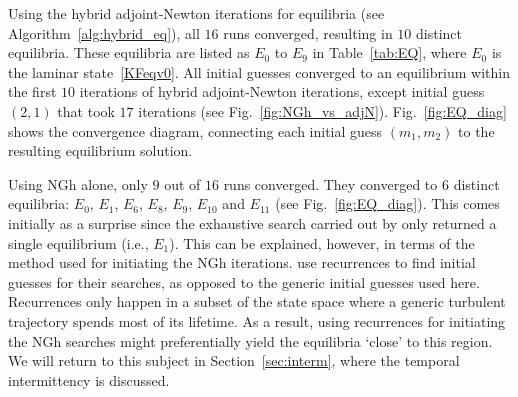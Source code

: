 \documentclass{jfm}
\begin{document}
Using the hybrid adjoint-Newton iterations for equilibria (see Algorithm~\ref{alg:hybrid_eq}), all
$16$ runs converged, resulting in $10$ distinct equilibria. These equilibria are listed as $E_0$
to $E_9$ in Table~\ref{tab:EQ}, where $E_0$ is the laminar state~\eqref{KFeqv0}.
All initial guesses converged to an equilibrium within the first $10$ iterations
of hybrid adjoint-Newton iterations, except initial guess $(2,1)$ that took $17$ iterations
(see Fig.~\ref{fig:NGh_vs_adjN}). Fig.~\ref{fig:EQ_diag} shows the convergence diagram, connecting
each initial guess $(m_1,m_2)$ to the resulting equilibrium solution.

Using NGh alone, only $9$ out of $16$ runs converged. They converged to $6$ distinct
equilibria: $E_0$, $E_1$, $E_6$, $E_8$, $E_9$, $E_{10}$ and $E_{11}$
(see Fig.~\ref{fig:EQ_diag}).
This comes initially as a surprise since the exhaustive search carried out by only
returned
a single equilibrium (i.e., $E_1$).
This can be explained, however, in terms of the method used for initiating
the NGh iterations. \cite{CK13} use recurrences to find initial guesses for their searches, as
opposed to the generic initial guesses used here. Recurrences only happen in a subset of the
state space where a generic turbulent trajectory spends most of its lifetime.
As a result, using recurrences for initiating the NGh searches
might preferentially yield the equilibria `close' to this region.
We will return to this subject in Section~\ref{sec:interm}, where the temporal
intermittency is discussed.
%
\end{document}
